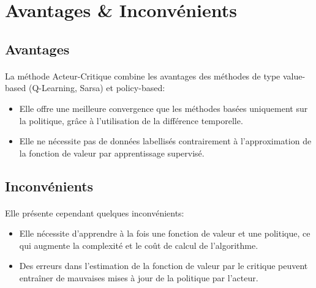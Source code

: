 \section{Avantages \& Inconvénients}

\subsection{Avantages}

\paragraph{}
La méthode Acteur-Critique combine les avantages des méthodes de type value-based (Q-Learning, Sarsa) et policy-based:
\begin{itemize}
  \item Elle offre une meilleure convergence que les méthodes basées uniquement sur la politique, grâce à l'utilisation de la différence temporelle.
  \item Elle ne nécessite pas de données labellisés contrairement à l'approximation de la fonction de valeur par apprentissage supervisé.
\end{itemize}
\subsection{Inconvénients}
\paragraph{}
Elle présente cependant quelques inconvénients:
\begin{itemize}
  \item Elle nécessite d'apprendre à la fois une fonction de valeur et une politique, ce qui augmente la complexité et le coût de calcul de l'algorithme.
  \item Des erreurs dans l'estimation de la fonction de valeur par le critique peuvent entraîner de mauvaises mises à jour de la politique par l'acteur.
\end{itemize}


